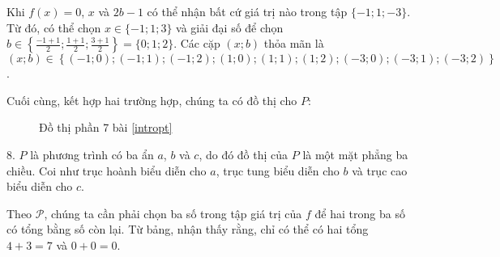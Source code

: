 Khi $f(x) = 0$, $x$ và $2b-1$ có thể nhận bất cứ giá trị nào trong tập $\{-1; 1; -3\}$. Từ đó, có thể chọn $x \in \{-1; 1; 3\}$ và giải đại số để chọn $b \in \left\{\frac{-1+1}{2}; \frac{1+1}{2}; \frac{3+1}{2}\right\} = \{0; 1; 2\}$. Các cặp $(x; b)$ thỏa mãn là $(x; b) \in \left\{\left(-1; 0\right); \left(-1; 1\right); \left(-1; 2\right); \left(1; 0\right); \left(1; 1\right); \left(1; 2\right); \left(-3; 0\right); \left(-3; 1\right); \left(-3; 2\right)\right\}$.

Cuối cùng, kết hợp hai trường hợp, chúng ta có đồ thị cho $P$:

\begin{figure}[h]
   \centering
   \caption{Đồ thị phần 7 bài \ref{intropt}}
   \label{fig:dtp7}
\end{figure}

8. $P$ là phương trình có ba ẩn $a$, $b$ và $c$, do đó đồ thị của $P$ là một mặt phẳng ba chiều. Coi như trục hoành biểu diễn cho $a$, trục tung biểu diễn cho $b$ và trục cao biểu diễn cho $c$.

Theo $\mathcal{P}$, chúng ta cần phải chọn ba số trong tập giá trị của $f$ để hai trong ba số có tổng bằng số còn lại. Từ bảng, nhận thấy rằng, chỉ có thể có hai tổng $4 + 3 = 7$ và $0 + 0 = 0$.


